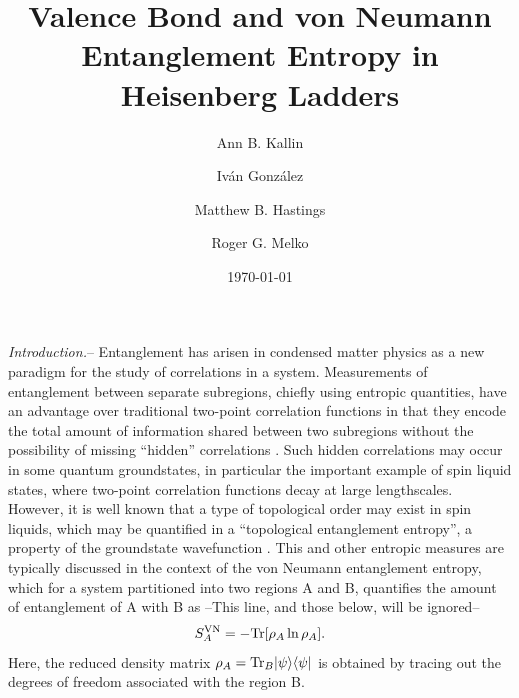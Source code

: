 \documentclass[prl,aps,twocolumn,floatfix,amsmath,amssymb,superscriptaddress,tightenlines]{revtex4}
\begin{document}
\date{\today}
\title{Valence Bond and von Neumann Entanglement Entropy in Heisenberg Ladders}
\author{Ann B. Kallin}

\author{Iv\'an Gonz\'alez}

\author{Matthew B. Hastings}

\author{Roger G. Melko}

\begin{abstract}

\end{abstract}
\maketitle


{\it Introduction.}-- Entanglement has arisen in condensed matter physics
as a new paradigm for the study of correlations in a system.  Measurements
of entanglement between separate subregions, chiefly using entropic
quantities, have an advantage over traditional two-point correlation
functions in that they encode the total amount of information shared
between two subregions without the possibility of missing ``hidden''
correlations \cite{wolf}.  Such hidden correlations may occur in some
quantum groundstates,  in particular the important example of spin liquid
states, where two-point correlation functions decay at large lengthscales.
However, it is well known that a type of topological order may exist in
spin liquids, which may be quantified in a ``topological entanglement
entropy'', a property of the groundstate wavefunction \cite{ KP, LW}.
This and other entropic measures are typically discussed in the context of
the von Neumann entanglement entropy, which for a system partitioned into
two regions A and B, quantifies the amount of entanglement of A with B as
--This line, and those below, will be ignored-- \begin{equation} S^{\rm
VN}_A = - {\rm Tr} [ \rho_A \ln \rho_A ]. \label{vNEE} \end{equation}
Here, the reduced density matrix $\rho_A = {\rm Tr}_B | \psi \rangle
\langle \psi |$ is obtained by tracing out the degrees of freedom
associated with the region B.
\end{document}
